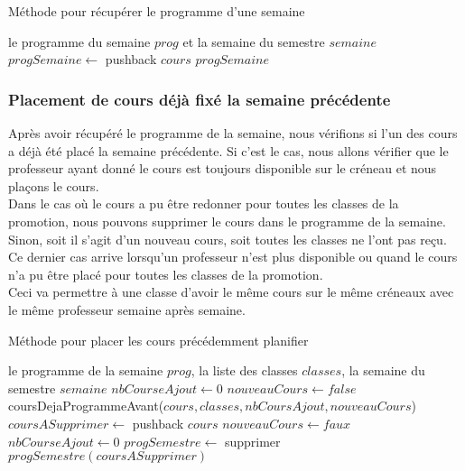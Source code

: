 \newpage

\begin{algorithm}
\caption{Méthode pour récupérer le programme d'une semaine}
\begin{algorithmic}
\REQUIRE le programme du semaine $prog$ et la semaine du semestre $semaine$
\STATE $progSemaine \leftarrow$ pushback $cours$
\ENDIF
\ENDFOR
\RETURN $progSemaine$
\end{algorithmic}
\end{algorithm}

\subsubsection{Placement de cours déjà fixé la semaine précédente}

Après avoir récupéré le programme de la semaine, nous vérifions si l'un des cours a déjà été placé la semaine précédente. Si c'est le cas, nous allons vérifier que le professeur ayant donné le cours est toujours disponible sur le créneau et nous plaçons le cours.\\

Dans le cas où le cours a pu être redonner pour toutes les classes de la promotion, nous pouvons supprimer le cours dans le programme de la semaine. Sinon, soit il s'agit d'un nouveau cours, soit toutes les classes ne l'ont pas reçu. Ce dernier cas arrive lorsqu'un professeur n'est plus disponible ou quand le cours n'a pu être placé pour toutes les classes de la promotion.\\

Ceci va permettre à une classe d'avoir le même cours sur le même créneaux avec le même professeur semaine après semaine.

\begin{algorithm}
\caption{Méthode pour placer les cours précédemment planifier}
\begin{algorithmic}
\REQUIRE le programme de la semaine $prog$, la liste des classes $classes$, la semaine du semestre $semaine$
\STATE $nbCourseAjout \leftarrow 0$
\STATE $nouveauCours \leftarrow false$
\STATE coursDejaProgrammeAvant($cours, classes, nbCoursAjout, nouveauCours$)
\STATE $coursASupprimer \leftarrow$ pushback $cours$
\ELSE 
\STATE $nouveauCours \leftarrow faux$
\ENDIF
\STATE $nbCourseAjout \leftarrow 0$
\ENDFOR
{}
\STATE $progSemestre \leftarrow$ supprimer $progSemestre(coursASupprimer)$
\ENDFOR
\ENDIF
\end{algorithmic}
\end{algorithm}


